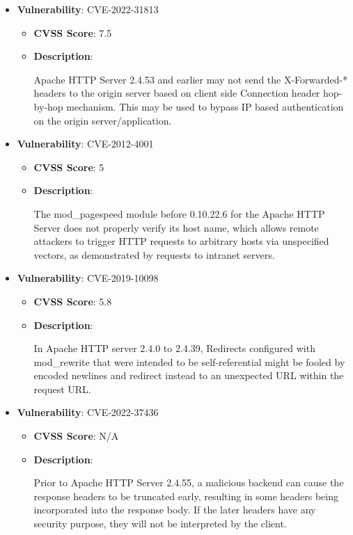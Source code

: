 \documentclass{article}
\begin{document}
\begin{itemize}
        \item \textbf{Vulnerability}: CVE-2022-31813
        \begin{itemize}
            \item \textbf{CVSS Score}:  7.5 
            \item \textbf{Description}:
            \parbox[t]{0.9\linewidth}{
                \ttfamily Apache HTTP Server 2.4.53 and earlier may not send the X-Forwarded-* headers to the origin server based on client side Connection header hop-by-hop mechanism. This may be used to bypass IP based authentication on the origin server/application.
            }
        \end{itemize}
    
        \item \textbf{Vulnerability}: CVE-2012-4001
        \begin{itemize}
            \item \textbf{CVSS Score}:  5 
            \item \textbf{Description}:
            \parbox[t]{0.9\linewidth}{
                \ttfamily The mod\_pagespeed module before 0.10.22.6 for the Apache HTTP Server does not properly verify its host name, which allows remote attackers to trigger HTTP requests to arbitrary hosts via unspecified vectors, as demonstrated by requests to intranet servers.
            }
        \end{itemize}
    
        \item \textbf{Vulnerability}: CVE-2019-10098
        \begin{itemize}
            \item \textbf{CVSS Score}:  5.8 
            \item \textbf{Description}:
            \parbox[t]{0.9\linewidth}{
                \ttfamily In Apache HTTP server 2.4.0 to 2.4.39, Redirects configured with mod\_rewrite that were intended to be self-referential might be fooled by encoded newlines and redirect instead to an unexpected URL within the request URL.
            }
        \end{itemize}
    
        \item \textbf{Vulnerability}: CVE-2022-37436
        \begin{itemize}
            \item \textbf{CVSS Score}:  N/A 
            \item \textbf{Description}:
            \parbox[t]{0.9\linewidth}{
                \ttfamily Prior to Apache HTTP Server 2.4.55, a malicious backend can cause the response headers to be truncated early, resulting in some headers being incorporated into the response body. If the later headers have any security purpose, they will not be interpreted by the client.
            }
        \end{itemize}
    

\end{itemize}
\end{document}

